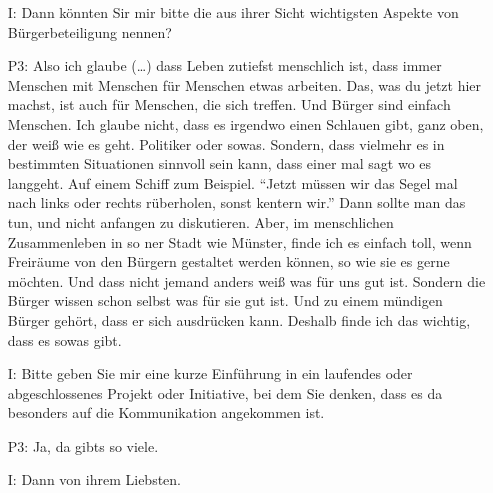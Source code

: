 \begin{itemize}
noch andere Sachen dazukommen. Also, eine Sache wird noch dazukommen, dass ich f{\"u}r M{\"u}nsteraner B{\"u}rger Themen anbiete, wie zum Beispiel "`Wie funktioniert intrinsisch motivierte Arbeit"'. Das geht so ein bisschen dass das Thema Burnout ein bisschen der Vergangenheit angeh{\"o}rt. Das Thema "`Happy working people"' und "`Sinnerf{\"u}lltes Arbeiten -- Wie geht das in M{\"u}nster"'. Das sind so die vier Themen.
    \item[I:] Dann k{\"o}nnten Sir mir bitte die aus ihrer Sicht wichtigsten Aspekte von B{\"u}rgerbeteiligung nennen?
    \item[P3:] Also ich glaube (\dots) dass Leben zutiefst menschlich ist, dass immer Menschen mit Menschen f{\"u}r Menschen etwas arbeiten. Das, was du jetzt hier machst, ist auch f{\"u}r Menschen, die sich treffen. Und B{\"u}rger sind einfach Menschen. Ich glaube nicht, dass es irgendwo einen Schlauen gibt, ganz oben, der wei{\ss} wie es geht. Politiker oder sowas. Sondern, dass vielmehr es in bestimmten Situationen sinnvoll sein kann, dass einer mal sagt wo es langgeht. Auf einem Schiff zum Beispiel. "`Jetzt m{\"u}ssen wir das Segel mal nach links oder rechts r{\"u}berholen, sonst kentern wir."' Dann sollte man das tun, und nicht anfangen zu diskutieren. Aber, im menschlichen Zusammenleben in so ner Stadt wie M{\"u}nster, finde ich es einfach toll, wenn Freir{\"a}ume von den B{\"u}rgern gestaltet werden k{\"o}nnen, so wie sie es gerne m{\"o}chten. Und dass nicht jemand anders wei{\ss} was f{\"u}r uns gut ist. Sondern die B{\"u}rger wissen schon selbst was f{\"u}r sie gut ist. Und zu einem m{\"u}ndigen B{\"u}rger geh{\"o}rt, dass er sich ausdr{\"u}cken kann. Deshalb finde ich das wichtig, dass es sowas gibt.
    \item[I:] Bitte geben Sie mir eine kurze Einf{\"u}hrung in ein laufendes oder abgeschlossenes Projekt oder Initiative, bei dem Sie denken, dass es da besonders auf die Kommunikation angekommen ist.
    \item[P3:] Ja, da gibts so viele.
    \item[I:] Dann von ihrem Liebsten.

\end{itemize}
